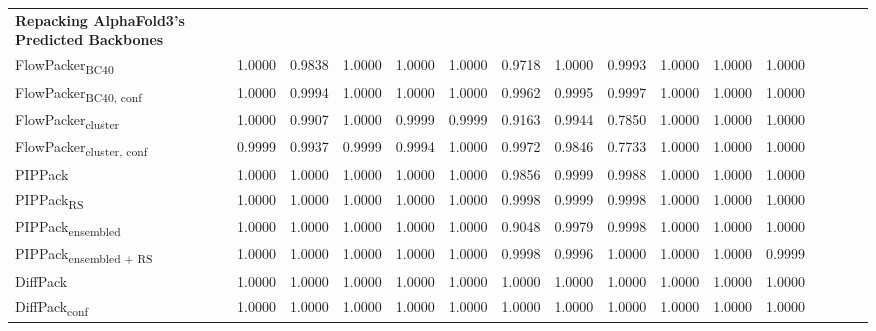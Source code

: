 \begin{table}
{\begin{tabular}{@{}lccccccccccccccc@{}}
            \midrule
            \textbf{Repacking AlphaFold3's Predicted Backbones} & & & & & & & & & \\ 
                \textnormal{\hspace{0.5cm}FlowPacker\textsubscript{BC40}} & 1.0000 & 0.9838 & 1.0000 & 1.0000 & 1.0000 & 0.9718 & 1.0000 & 0.9993 & 1.0000 & 1.0000 & 1.0000 \\
                \textnormal{\hspace{0.5cm}FlowPacker\textsubscript{BC40, conf}} & 1.0000 & 0.9994 & 1.0000 & 1.0000 & 1.0000 & 0.9962 & 0.9995 & 0.9997 & 1.0000 & 1.0000 & 1.0000 \\
                \textnormal{\hspace{0.5cm}FlowPacker\textsubscript{cluster}} & 1.0000 & 0.9907 & 1.0000 & 0.9999 & 0.9999 & 0.9163 & 0.9944 & 0.7850 & 1.0000 & 1.0000 & 1.0000 \\
                \textnormal{\hspace{0.5cm}FlowPacker\textsubscript{cluster, conf}} & 0.9999 & 0.9937 & 0.9999 & 0.9994 & 1.0000 & 0.9972 & 0.9846 & 0.7733 & 1.0000 & 1.0000 & 1.0000 \\
                \textnormal{\hspace{0.5cm}PIPPack} & 1.0000 & 1.0000 & 1.0000 & 1.0000 & 1.0000 & 0.9856 & 0.9999 & 0.9988 & 1.0000 & 1.0000 & 1.0000 \\
                \textnormal{\hspace{0.5cm}PIPPack\textsubscript{RS}} & 1.0000 & 1.0000 & 1.0000 & 1.0000 & 1.0000 & 0.9998 & 0.9999 & 0.9998 & 1.0000 & 1.0000 & 1.0000 \\
                \textnormal{\hspace{0.5cm}PIPPack\textsubscript{ensembled}} & 1.0000 & 1.0000 & 1.0000 & 1.0000 & 1.0000 & 0.9048 & 0.9979 & 0.9998 & 1.0000 & 1.0000 & 1.0000 \\
                \textnormal{\hspace{0.5cm}PIPPack\textsubscript{ensembled + RS}} & 1.0000 & 1.0000 & 1.0000 & 1.0000 & 1.0000 & 0.9998 & 0.9996 & 1.0000 & 1.0000 & 1.0000 & 0.9999 \\
                \textnormal{\hspace{0.5cm}DiffPack} & 1.0000 & 1.0000 & 1.0000 & 1.0000 & 1.0000 & 1.0000 & 1.0000 & 1.0000 & 1.0000 & 1.0000 & 1.0000 \\
                \textnormal{\hspace{0.5cm}DiffPack\textsubscript{conf}} & 1.0000 & 1.0000 & 1.0000 & 1.0000 & 1.0000 & 1.0000 & 1.0000 & 1.0000 & 1.0000 & 1.0000 & 1.0000 \\

\end{tabular}}
\end{table}
